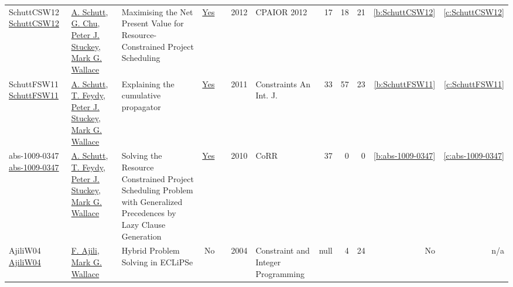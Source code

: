 {\begin{longtable}{>{\raggedright\arraybackslash}p{3cm}>{\raggedright\arraybackslash}p{6cm}>{\raggedright\arraybackslash}p{6.5cm}rrrp{2.5cm}rrrrr}
SchuttCSW12 \href{https://doi.org/10.1007/978-3-642-29828-8\_24}{SchuttCSW12} & \hyperref[auth:a125]{A. Schutt}, \hyperref[auth:a349]{G. Chu}, \hyperref[auth:a126]{Peter J. Stuckey}, \hyperref[auth:a156]{Mark G. Wallace} & Maximising the Net Present Value for Resource-Constrained Project Scheduling & \href{works/SchuttCSW12.pdf}{Yes} & \cite{SchuttCSW12} & 2012 & CPAIOR 2012 & 17 & 18 & 21 & \ref{b:SchuttCSW12} & \ref{c:SchuttCSW12}\\
SchuttFSW11 \href{https://doi.org/10.1007/s10601-010-9103-2}{SchuttFSW11} & \hyperref[auth:a125]{A. Schutt}, \hyperref[auth:a155]{T. Feydy}, \hyperref[auth:a126]{Peter J. Stuckey}, \hyperref[auth:a156]{Mark G. Wallace} & Explaining the cumulative propagator & \href{works/SchuttFSW11.pdf}{Yes} & \cite{SchuttFSW11} & 2011 & Constraints An Int. J. & 33 & 57 & 23 & \ref{b:SchuttFSW11} & \ref{c:SchuttFSW11}\\
abs-1009-0347 \href{http://arxiv.org/abs/1009.0347}{abs-1009-0347} & \hyperref[auth:a125]{A. Schutt}, \hyperref[auth:a155]{T. Feydy}, \hyperref[auth:a126]{Peter J. Stuckey}, \hyperref[auth:a156]{Mark G. Wallace} & Solving the Resource Constrained Project Scheduling Problem with Generalized Precedences by Lazy Clause Generation & \href{works/abs-1009-0347.pdf}{Yes} & \cite{abs-1009-0347} & 2010 & CoRR & 37 & 0 & 0 & \ref{b:abs-1009-0347} & \ref{c:abs-1009-0347}\\
AjiliW04 \href{http://dx.doi.org/10.1007/978-1-4419-8917-8_6}{AjiliW04} & \hyperref[auth:a972]{F. Ajili}, \hyperref[auth:a156]{Mark G. Wallace} & Hybrid Problem Solving in ECLiPSe & No & \cite{AjiliW04} & 2004 & Constraint and Integer Programming & null & 4 & 24 & No & n/a\\
\end{longtable}
}

